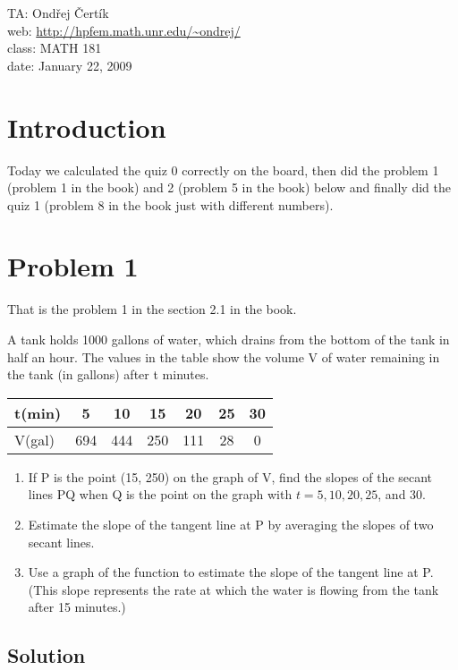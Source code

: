 \documentclass[10pt]{article}
\begin{document}
\noindent TA: Ondřej Čertík\\
web: \url{http://hpfem.math.unr.edu/~ondrej/}\\
class: MATH 181\\
date: January 22, 2009

\section{Introduction}

Today we calculated the quiz 0 correctly on the board, then did the problem 1
(problem 1 in the book) and 2 (problem 5 in the book) below and finally did the
quiz 1 (problem 8 in the book just with different numbers).

\section{Problem 1}

That is the problem 1 in the section 2.1 in the book.

A tank holds 1000 gallons of water, which drains from the bottom of the tank in
half an hour. The values in the table show the volume V of water remaining in
the tank (in gallons) after t minutes.

\begin{tabular}{|l||c|c|c|c|c|c|}
\hline
t(min) & 5   & 10  & 15  & 20  & 25 & 30 \\ \hline
V(gal) & 694 & 444 & 250 & 111 & 28 & 0 \\
\hline
\end{tabular}

\renewcommand{\labelenumi}{(\alph{enumi})}
\renewcommand{\labelenumii}{(\roman{enumii})}
\begin{enumerate}
\item If P is the point (15, 250) on the graph of V, find the
slopes of the secant lines PQ when Q is the point on the
graph with $t = 5, 10, 20, 25$, and 30.

\item Estimate the slope of the tangent line at P by averaging
the slopes of two secant lines.

\item Use a graph of the function to estimate the slope of the tangent line at
P.  (This slope represents the rate at which the water is flowing from the tank
after 15 minutes.)
\end{enumerate}

\subsection*{Solution}
\end{document}
